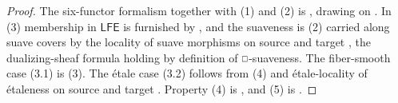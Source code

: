 \begin{proof}
    The six-functor formalism together with (1) and (2) is , drawing on \cite[Prop. 3.1.8 \& 3.2.2]{HeyerMann6FF}. In (3) membership in $\mathsf{LFE}$ is furnished by , and the suaveness is  (2) carried along suave covers by the locality of suave morphisms on source and target \cite[\S 4.5]{HeyerMann6FF}, the dualizing-sheaf formula holding by definition of $\msld$-suaveness. The fiber-smooth case (3.1) is  (3). The \'{e}tale case (3.2) follows from  (4) and \'{e}tale-locality of \'{e}taleness on source and target \cite[Lem. 4.6.3]{HeyerMann6FF}. Property (4) is , and (5) is .
\end{proof}